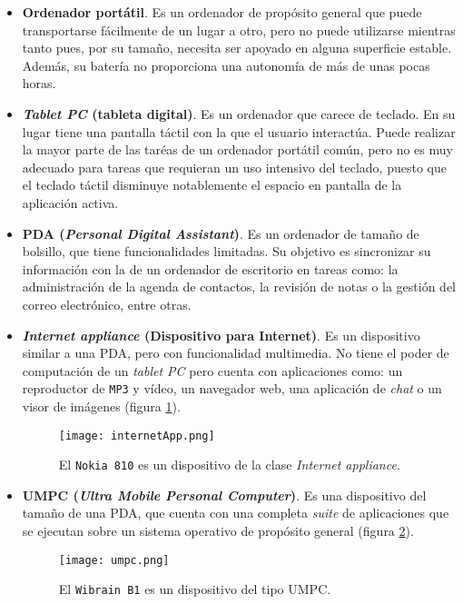 \begin{itemize}
\item \textbf{Ordenador portátil}. Es un ordenador de propósito general
que puede transportarse fácilmente de un lugar a otro, pero no puede utilizarse 
mientras tanto pues, por su tamaño, necesita ser apoyado en alguna superficie 
estable. Además, su batería no proporciona una autonomía de más de unas pocas
horas.
\item \textbf{\emph{Tablet PC} (tableta digital)}. Es un ordenador que carece 
de teclado. En su lugar tiene una pantalla táctil con la que el usuario 
interactúa. Puede realizar la mayor parte de las taréas de un ordenador 
portátil común, pero no es muy adecuado para tareas que requieran un uso 
intensivo del teclado, puesto que el teclado táctil disminuye notablemente el 
espacio en pantalla de la aplicación activa.
\item \textbf{\acs{PDA} (\emph{Personal Digital Assistant})}. Es un
ordenador de tamaño de bolsillo, que tiene funcionalidades limitadas. Su
objetivo es sincronizar su información con la de un ordenador de escritorio
en tareas como: la administración de la agenda de contactos, la revisión de
notas o la gestión del correo electrónico, entre otras.
\item \textbf{\emph{Internet appliance} (Dispositivo para Internet)}. Es un 
dispositivo similar a una \acs{PDA}, pero con funcionalidad multimedia. No 
tiene el poder de computación de un \emph{tablet PC} pero cuenta con 
aplicaciones como: un reproductor de \texttt{MP3} y vídeo, un navegador web, 
una aplicación de \emph{chat} o un visor de imágenes (figura
\ref{fig:internetApp}).

  \begin{figure}[H]
    \begin{center}
      \texttt{[image: internetApp.png]}
      \caption{El \texttt{Nokia 810} es un dispositivo de la clase
      \emph{Internet appliance}.}
      \label{fig:internetApp}
    \end{center}
  \end{figure}

\item \textbf{\acs{UMPC} (\emph{Ultra Mobile Personal Computer})}. Es una
dispositivo del tamaño de una \acs{PDA}, que cuenta con una completa 
\emph{suite} de aplicaciones que se ejecutan sobre un sistema operativo de 
propósito general (figura \ref{fig:umpc}).

  \begin{figure}[H]
    \begin{center}
      \texttt{[image: umpc.png]}
      \caption{El \texttt{Wibrain B1} es un dispositivo del tipo \acs{UMPC}.}
      \label{fig:umpc}
    \end{center}
  \end{figure}


\end{itemize}
